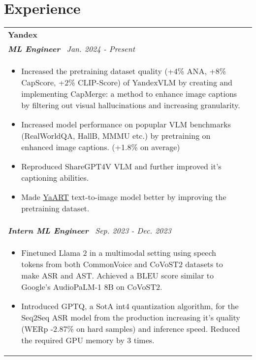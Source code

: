 \documentclass[a4paper,8pt]{article}
\begin{document}
\section{Experience}
\begin{tabularx}{\linewidth}{ @{}l r@{} }
\textbf{Yandex} \\[4pt]
\color[HTML]{371e77}\textbf{\textit{ML Engineer}}\ \hfill \color[HTML]{4B28A4} \textit{Jan. 2024 - Present} \\[5pt]
\begin{minipage}[t]{\linewidth}
    \begin{itemize}[nosep,after=\strut, leftmargin=2em, itemsep=2pt]
        \item Increased the pretraining dataset quality (+4\% ANA, +8\% CapScore, +2\% CLIP-Score) of YandexVLM by creating and implementing CapMerge: a method to enhance image captions by filtering out visual hallucinations and increasing granularity.
        \item Increased model performance on popuplar VLM benchmarks (RealWorldQA, HallB, MMMU etc.) by pretraining on enhanced image captions. (+1.8\% on average)
        \item Reproduced ShareGPT4V VLM and further improved it's captioning abilities.
        \item Made \href{https://ya.ru/ai/art/paper-yaart-v1}{YaART} text-to-image model better by improving the pretraining dataset.
    \end{itemize}
\end{minipage} \\

\color[HTML]{371e77}\textbf{\textit{Intern ML Engineer}}\ \hfill \color[HTML]{4B28A4} \textit{Sep. 2023 - Dec. 2023} \\[5pt]
\begin{minipage}[t]{\linewidth}
    \begin{itemize}[nosep,after=\strut, leftmargin=2em, itemsep=2pt]
        \item Finetuned Llama 2 in a multimodal setting using speech tokens from both CommonVoice and CoVoST2 datasets to make ASR and AST. Achieved a BLEU score similar to Google's AudioPaLM-1 8B on CoVoST2.
        \item Introduced GPTQ, a SotA int4 quantization algorithm, for the Seq2Seq ASR model from the production increasing it’s quality (WERp -2.87\% on hard samples) and inference speed. Reduced the required GPU memory by 3 times.
    \end{itemize}
\end{minipage}
\end{tabularx}
\end{document}
